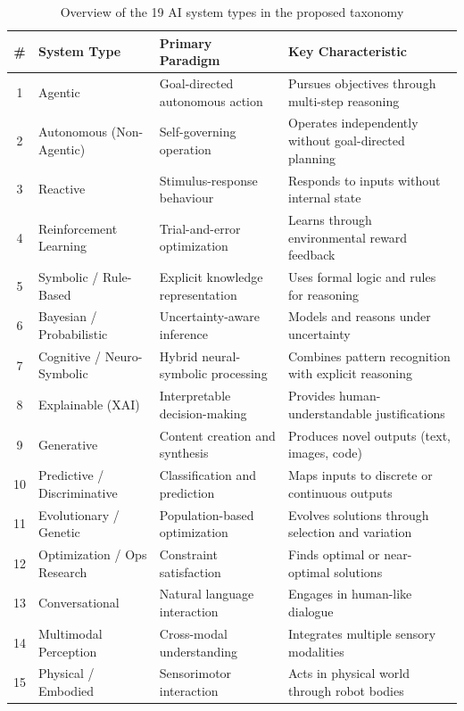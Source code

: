 \documentclass[12pt, a4paper]{article}
\begin{document}
\begin{table}[ht]
  \caption{Overview of the 19 AI system types in the proposed taxonomy}
  \label{tab:taxonomy-overview}
  \small
  \begin{tabular}{c p{3.5cm} p{4cm} p{5.5cm}}
    \toprule
    \textbf{\#} & \textbf{System Type} & \textbf{Primary Paradigm} & \textbf{Key Characteristic} \\
    \midrule
    1 & Agentic & Goal-directed autonomous action & Pursues objectives through multi-step reasoning \\
    2 & Autonomous (Non-Agentic) & Self-governing operation & Operates independently without goal-directed planning \\
    3 & Reactive & Stimulus-response behaviour & Responds to inputs without internal state \\
    4 & Reinforcement Learning & Trial-and-error optimization & Learns through environmental reward feedback \\
    5 & Symbolic / Rule-Based & Explicit knowledge representation & Uses formal logic and rules for reasoning \\
    6 & Bayesian / Probabilistic & Uncertainty-aware inference & Models and reasons under uncertainty \\
    7 & Cognitive / Neuro-Symbolic & Hybrid neural-symbolic processing & Combines pattern recognition with explicit reasoning \\
    8 & Explainable (XAI) & Interpretable decision-making & Provides human-understandable justifications \\
    9 & Generative & Content creation and synthesis & Produces novel outputs (text, images, code) \\
    10 & Predictive / Discriminative & Classification and prediction & Maps inputs to discrete or continuous outputs \\
    11 & Evolutionary / Genetic & Population-based optimization & Evolves solutions through selection and variation \\
    12 & Optimization / Ops Research & Constraint satisfaction & Finds optimal or near-optimal solutions \\
    13 & Conversational & Natural language interaction & Engages in human-like dialogue \\
    14 & Multimodal Perception & Cross-modal understanding & Integrates multiple sensory modalities \\
    15 & Physical / Embodied & Sensorimotor interaction & Acts in physical world through robot bodies \\

\end{tabular}
\end{table}
\end{document}
